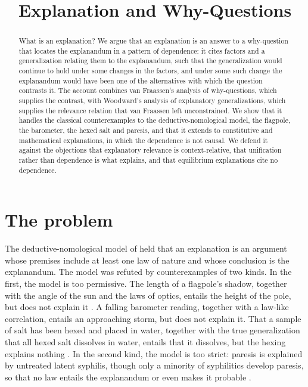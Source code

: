 \documentclass{situationist-preprint}
\title{Explanation and Why-Questions}
\begin{document}
\maketitle

\begin{abstract}
What is an explanation? We argue that an explanation is an answer to a why-question that locates the explanandum in a pattern of dependence: it cites factors and a generalization relating them to the explanandum, such that the generalization would continue to hold under some changes in the factors, and under some such change the explanandum would have been one of the alternatives with which the question contrasts it. The account combines van Fraassen's analysis of why-questions, which supplies the contrast, with Woodward's analysis of explanatory generalizations, which supplies the relevance relation that van Fraassen left unconstrained. We show that it handles the classical counterexamples to the deductive-nomological model, the flagpole, the barometer, the hexed salt and paresis, and that it extends to constitutive and mathematical explanations, in which the dependence is not causal. We defend it against the objections that explanatory relevance is context-relative, that unification rather than dependence is what explains, and that equilibrium explanations cite no dependence.
\end{abstract}

\section{The problem}\label{s:problem}

The deductive-nomological model of \citet{HempelOppenheim1948} held that an explanation is an argument whose premises include at least one law of nature and whose conclusion is the explanandum. The model was refuted by counterexamples of two kinds. In the first, the model is too permissive. The length of a flagpole's shadow, together with the angle of the sun and the laws of optics, entails the height of the pole, but does not explain it \citep{Bromberger1966}. A falling barometer reading, together with a law-like correlation, entails an approaching storm, but does not explain it. That a sample of salt has been hexed and placed in water, together with the true generalization that all hexed salt dissolves in water, entails that it dissolves, but the hexing explains nothing \citep{Kyburg1965}. In the second kind, the model is too strict: paresis is explained by untreated latent syphilis, though only a minority of syphilitics develop paresis, so that no law entails the explanandum or even makes it probable \citep{Scriven1959}.
\end{document}
